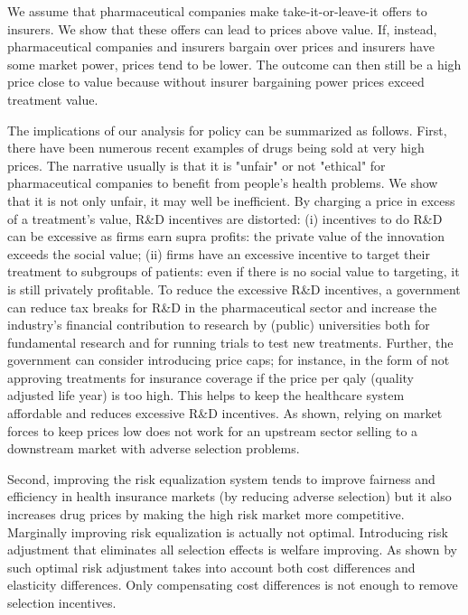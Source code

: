 \documentclass[12pt,english,a4paper]{article}
\begin{document}
We assume that pharmaceutical companies make take-it-or-leave-it offers to insurers. We show that these offers can lead to prices above value. If, instead, pharmaceutical companies and insurers bargain over prices and insurers have some market power, prices tend to be lower. The outcome can then still be a high price close to value because without insurer bargaining power prices exceed treatment value.

The implications of our analysis for policy can be summarized as follows. First, there have been numerous recent examples of drugs being sold at very high prices. The narrative usually is that it is "unfair" or not "ethical" for pharmaceutical companies to benefit from people's health problems. We show that it is not only unfair, it may well be inefficient. By charging a price in excess of a treatment's value, R\&D incentives are distorted: (i) incentives to do R\&D can be excessive as firms earn supra profits: the private value of the innovation exceeds the social value; (ii) firms have an excessive incentive to target their treatment to subgroups of patients: even if there is no social value to targeting, it is still privately profitable. To reduce the excessive R\&D incentives, a government can reduce tax breaks for R\&D in the pharmaceutical sector and increase the industry's financial contribution to research by (public) universities both for fundamental research and for running trials to test new treatments. Further, the government can consider introducing price caps; for instance, in the form of not approving treatments for insurance coverage if the price per qaly (quality adjusted life year) is too high. This helps to keep the healthcare system affordable and reduces excessive R\&D incentives. As shown, relying on market forces to keep prices low does not work for an upstream sector selling to a downstream market with adverse selection problems.

Second, improving the risk equalization system tends to improve fairness and efficiency in health insurance markets (by reducing adverse selection) but it also increases drug prices by making the high risk market more competitive. Marginally improving risk equalization is actually not optimal. Introducing risk adjustment that eliminates all selection effects is welfare improving. As shown by \cite{bijlsma2014} such optimal risk adjustment takes into account both cost differences and elasticity differences. Only compensating cost differences is not enough to remove selection incentives.
\end{document}
